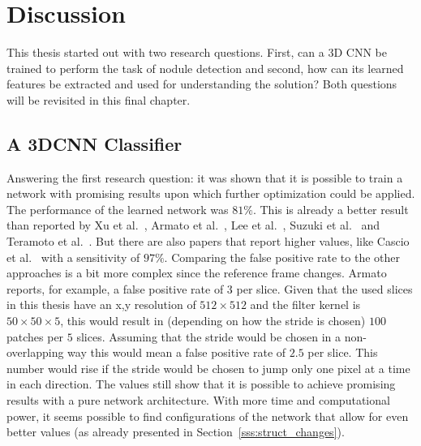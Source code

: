 \documentclass[main.tex]{subfiles}
\begin{document}
\chapter{Discussion}\label{chap:discussion}
This thesis started out with two research questions. First, can a 3D CNN be trained to perform the task of nodule detection and second, how can its learned features be extracted and used for understanding the solution? Both questions will be revisited in this final chapter.

\section{A 3DCNN Classifier}
Answering the first research question: it was shown that it is possible to train a network with promising results upon which further optimization could be applied. The performance of the learned network was $81\%$. This is already a better result than reported by Xu et al.~\cite{xu1997development}, Armato et al.~\cite{armato1999computerized}, Lee et al.~\cite{lee2001automated}, Suzuki et al.~\cite{suzuki2003massive} and Teramoto et al.~\cite{teramoto2013fast}. But there are also papers that report higher values, like Cascio et al.~\cite{cascio2012automatic} with a sensitivity of $97\%$. Comparing the false positive rate to the other approaches is a bit more complex since the reference frame changes. Armato~\cite{armato1999computerized} reports, for example, a false positive rate of 3 per slice. Given that the used slices in this thesis have an x,y resolution of $512 \times 512$ and the filter kernel is $50 \times 50 \times 5$, this would result in (depending on how the stride is chosen) $100$ patches per $5$ slices. Assuming that the stride would be chosen in a non-overlapping way this would mean a false positive rate of $2.5$ per slice. This number would rise if the stride would be chosen to jump only one pixel at a time in each direction. The values still show that it is possible to achieve promising results with a pure network architecture. With more time and computational power, it seems possible to find configurations of the network that allow for even better values (as already presented in Section~\ref{sss:struct_changes}). 
\end{document}
